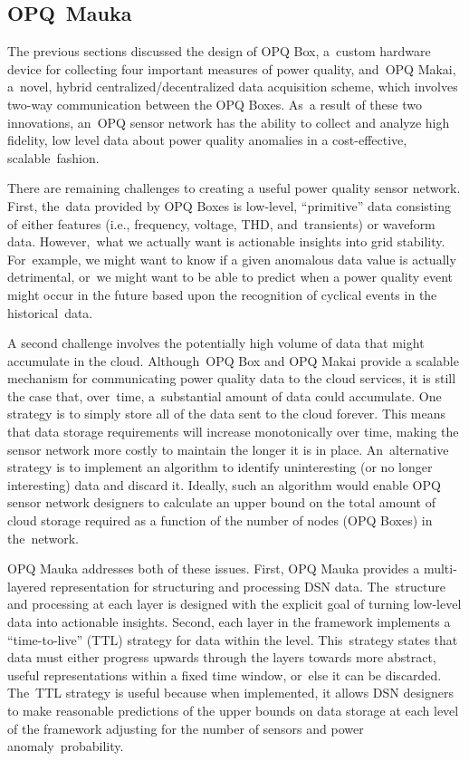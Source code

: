 \documentclass[energies,article,accept,moreauthors,pdftex]{Definitions/mdpi}
\begin{document}
\subsection{OPQ~Mauka}
\label{sec:opq-mauka}

The previous sections discussed the design of OPQ Box, a~custom hardware device for collecting four important measures of power quality, and~OPQ Makai, a~novel, hybrid centralized/decentralized data acquisition scheme, which involves two-way communication between the OPQ Boxes. As~a result of these two innovations, an~OPQ sensor network has the ability to collect and analyze high fidelity, low level data about power quality anomalies in a cost-effective, scalable~fashion.

There are remaining challenges to creating a useful power quality sensor network. First, the~data provided by OPQ Boxes is low-level, ``primitive'' data consisting of either features (i.e., frequency, voltage, THD, and~transients) or waveform data. However,~what we actually want is actionable insights into grid stability. For~example, we might want to know if a given anomalous data value is actually detrimental, or~we might want to be able to predict when a power quality event might occur in the future based upon the recognition of cyclical events in the historical~data.

A second challenge involves the potentially high volume of data that might accumulate in the cloud. Although~OPQ Box and OPQ Makai provide a scalable mechanism for communicating power quality data to the cloud services, it is still the case that, over~time, a~substantial amount of data could accumulate. One strategy is to simply store all of the data sent to the cloud forever. This means that data storage requirements will increase monotonically over time, making the sensor network more costly to maintain the longer it is in place. An~alternative strategy is to implement an algorithm to identify uninteresting (or no longer interesting) data and discard it. Ideally, such an algorithm would enable OPQ sensor network designers to calculate an upper bound on the total amount of cloud storage required as a function of the number of nodes (OPQ Boxes) in the~network.

OPQ Mauka addresses both of these issues. First, OPQ Mauka provides a multi-layered representation for structuring and processing DSN data. The~structure and processing at each layer is designed with the explicit goal of turning low-level data into actionable insights. Second, each layer in the framework implements a ``time-to-live'' (TTL) strategy for data within the level. This~strategy states that data must either progress upwards through the layers towards more abstract, useful representations within a fixed time window, or~else it can be discarded. The~TTL strategy is useful because when implemented, it allows DSN designers to make reasonable predictions of the upper bounds on data storage at each level of the framework adjusting for the number of sensors and power anomaly~probability.
\end{document}
